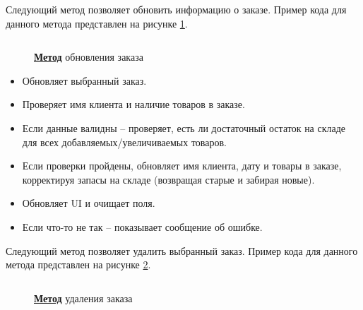 \documentclass[12pt]{article}
\newcommand{\colorGIT}[1]{\textbf{#1}}
\renewcommand{\texttt}[1]{{\small\ttfamily #1}}
\numberwithin{listing}{section}
\numberwithin{figure}{section}
\begin{document}
Следующий метод позволяет обновить информацию о заказе. Пример кода для данного метода представлен на рисунке \ref{fig:MethodUpdate2}.

\begin{figure}[H]
	\centering
	\inputminted[firstline=218, lastline=266]{csharp}{../../3lab/StoreManager/MainWindow.xaml.cs}
	\caption{\colorGIT{\href{https://github.com/WebMasterIT/Csharp_Labs/blob=ec375afd16c0647b337cf3d8a79c8bef904fc1be/3lab/StoreManager/MainWindow.xaml.cs\#L218-L266}{Метод}} обновления заказа}
	\label{fig:MethodUpdate2}
\end{figure}

\begin{itemize}
	\item Обновляет выбранный заказ.
	\item Проверяет имя клиента и наличие товаров в заказе.
	\item Если данные валидны -- проверяет, есть ли достаточный остаток на складе для всех добавляемых/увеличиваемых товаров.
	\item Если проверки пройдены, обновляет имя клиента, дату и товары в заказе, корректируя запасы на складе (возвращая старые и забирая новые).
	\item Обновляет \texttt{UI} и очищает поля.
	\item Если что-то не так -- показывает сообщение об ошибке.
\end{itemize}

Следующий метод позволяет удалить выбранный заказ. Пример кода для данного метода представлен на рисунке \ref{fig:MethodDelete2}.

\begin{figure}[H]
	\centering
	\inputminted[firstline=268, lastline=295]{csharp}{../../3lab/StoreManager/MainWindow.xaml.cs}
	\caption{\colorGIT{\href{https://github.com/WebMasterIT/Csharp_Labs/blob=ec375afd16c0647b337cf3d8a79c8bef904fc1be/3lab/StoreManager/MainWindow.xaml.cs\#L268-L295}{Метод}} удаления заказа}
	\label{fig:MethodDelete2}
\end{figure}
\end{document}
